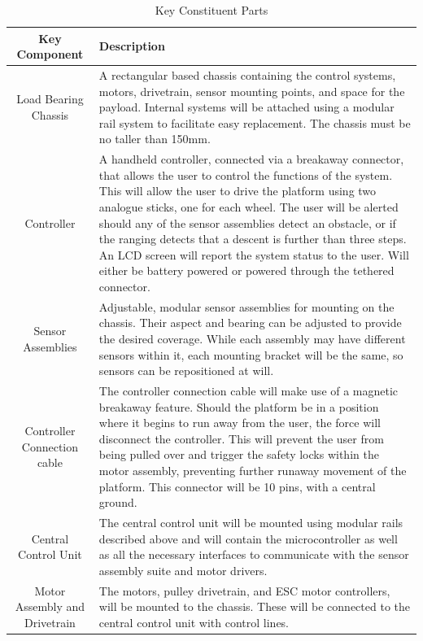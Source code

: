 \documentclass [12pt]{article}
\begin{document}
\begin{table}[H]
    \centering
    \setlength{\arrayrulewidth}{1.5pt}
    \begin{tabular}{|c| p{}|}
    \hline
    \cellcolor{gray!40}Key Component & \cellcolor{gray!40}Description \\
    \hline
    Load Bearing Chassis & A rectangular based chassis containing the control systems, motors, drivetrain, sensor mounting points, and space for the payload. Internal systems will be attached using a modular rail system to facilitate easy replacement. The chassis must be no taller than 150mm.\\
    \hline
    Controller & A handheld controller, connected via a breakaway connector, that allows the user to control the functions of the system. This will allow the user to drive the platform using two analogue sticks, one for each wheel. The user will be alerted should any of the sensor assemblies detect an obstacle, or if the ranging detects that a descent is further than three steps. An LCD screen will report the system status to the user. Will either be battery powered or powered through the tethered connector.\\
    \hline
    Sensor Assemblies & Adjustable, modular sensor assemblies for mounting on the chassis. Their aspect and bearing can be adjusted to provide the desired coverage. While each assembly may have different sensors within it, each mounting bracket will be the same, so sensors can be repositioned at will.\\
    \hline
    Controller Connection cable & The controller connection cable will make use of a magnetic breakaway feature. Should the platform be in a position where it begins to run away from the user, the force will disconnect the controller. This will prevent the user from being pulled over and trigger the safety locks within the motor assembly, preventing further runaway movement of the platform. This connector will be 10 pins, with a central ground. \\
    \hline
    Central Control Unit & The central control unit will be mounted using modular rails described above and will contain the microcontroller as well as all the necessary interfaces to communicate with the sensor assembly suite and motor drivers. \\
    \hline
    Motor Assembly and Drivetrain & The motors, pulley drivetrain, and ESC motor controllers, will be mounted to the chassis. These will be connected to the central control unit with control lines.\\
    \hline
    \end{tabular}
    \caption{Key Constituent Parts}
    \label{table:key_constituent_parts}
\end{table}
\end{document}
